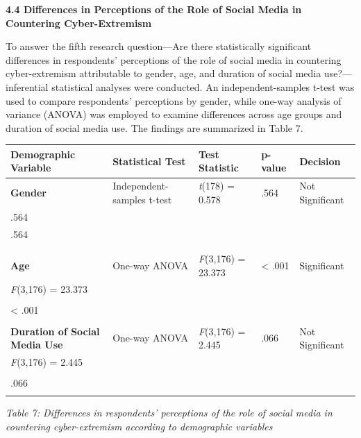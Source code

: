 \documentclass[11pt,a4paper]{article}
\begin{document}
	\textbf{4.4 Differences in Perceptions of the Role of Social Media in Countering Cyber-Extremism}
	
	To answer the fifth research question---Are there statistically significant differences in respondents' perceptions of the role of social media in countering cyber-extremism attributable to gender, age, and duration of social media use?---inferential statistical analyses were conducted. An independent-samples t-test was used to compare respondents' perceptions by gender, while one-way analysis of variance (ANOVA) was employed to examine differences across age groups and duration of social media use. The findings are summarized in Table 7.
	
	\begin{table}[h]
		\centering
		\begin{tabular}{|l|l|l|l|l|}
			\hline
			\textbf{Demographic Variable} & \textbf{Statistical Test} & \textbf{Test Statistic} & \textbf{p-value} & \textbf{Decision} \\ \hline
			\textbf{Gender} & Independent-samples t-test & \textit{t}(178) = 0.578 & .564 & Not Significant \\ \hline
			.564 &  &  &  &  \\ \hline
			.564 &  &  &  &  \\ \hline
			&  &  &  &  \\ \hline
			&  &  &  &  \\ \hline
			\textbf{Age} & One-way ANOVA & \textit{F}(3,176) = 23.373 & \textless{} .001 & Significant \\ \hline
			\textit{F}(3,176) = 23.373 &  &  &  &  \\ \hline
			&  &  &  &  \\ \hline
			\textless{} .001 &  &  &  &  \\ \hline
			&  &  &  &  \\ \hline
			\textbf{Duration of Social Media Use} & One-way ANOVA & \textit{F}(3,176) = 2.445 & .066 & Not Significant \\ \hline
			\textit{F}(3,176) = 2.445 &  &  &  &  \\ \hline
			&  &  &  &  \\ \hline
			.066 &  &  &  &  \\ \hline
			&  &  &  &  \\ \hline
		\end{tabular}
	\end{table}
	
	\textit{Table 7: Differences in respondents' perceptions of the role of social media in countering cyber-extremism according to demographic variables}
	
\end{document}
